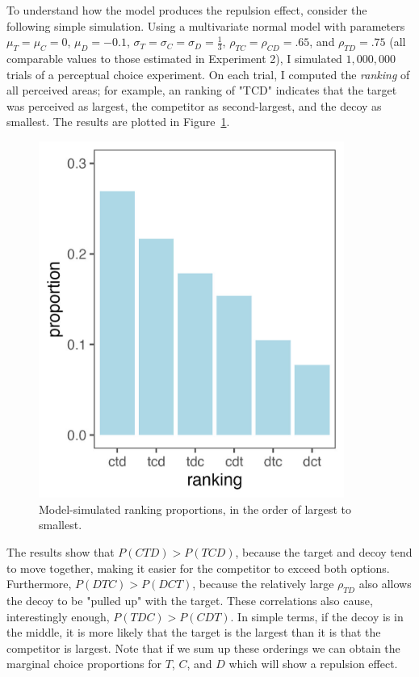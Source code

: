 To understand how the model produces the repulsion effect, consider the following simple simulation. Using a multivariate normal model with parameters $\mu_{T}=\mu_{C}=0$, $\mu_{D}=-0.1$, $\sigma_{T}=\sigma_{C}=\sigma_{D}=\frac{1}{3}$, $\rho_{TC}=\rho_{CD}=.65$, and $\rho_{TD}=.75$ (all comparable values to those estimated in Experiment 2), I simulated $1,000,000$ trials of a perceptual choice experiment. On each trial, I computed the \textit{ranking} of all perceived areas; for example, an ranking of "TCD" indicates that the target was perceived as largest, the competitor as second-largest, and the decoy as smallest. The results are plotted in Figure~\ref{fig:sim_orderings}. 

\begin{figure}
   \includegraphics[width=100mm]{figures/sim_mvnorm_rank.jpeg}
   \caption{Model-simulated ranking proportions, in the order of largest to smallest.}
   \label{fig:sim_orderings}
\end{figure}

The results show that $P(CTD)>P(TCD)$, because the target and decoy tend to move together, making it easier for the competitor to exceed both options. Furthermore, $P(DTC)>P(DCT)$, because the relatively large $\rho_{TD}$ also allows the decoy to be "pulled up" with the target. These correlations also cause, interestingly enough, $P(TDC)>P(CDT)$. In simple terms, if the decoy is in the middle, it is more likely that the target is the largest than it is that the competitor is largest. Note that if we sum up these orderings we can obtain the marginal choice proportions for $T$, $C$, and $D$ which will show a repulsion effect. 

